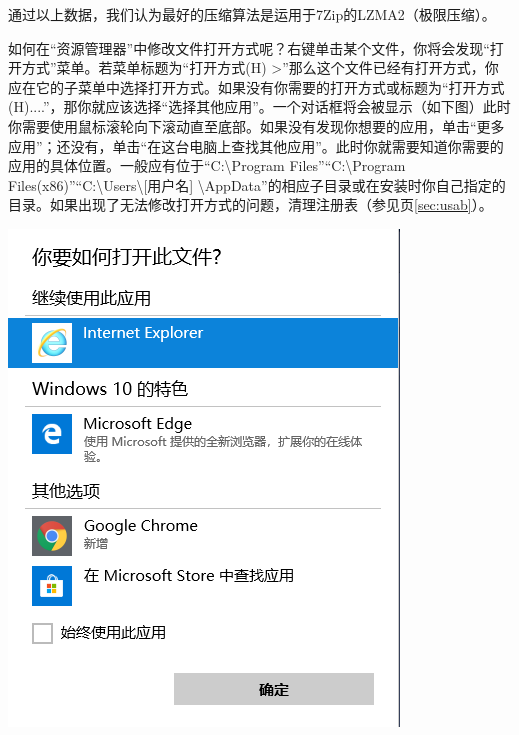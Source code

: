 通过以上数据，我们认为最好的压缩算法是运用于7Zip的LZMA2（极限压缩）。\par
如何在“资源管理器”中修改文件打开方式呢？右键单击某个文件，你将会发现“打开方式”菜单。若菜单标题为“打开方式(H)    >”那么这个文件已经有打开方式，你应在它的子菜单中选择打开方式。如果没有你需要的打开方式或标题为“打开方式(H)....”，那你就应该选择“选择其他应用”。一个对话框将会被显示（如下图）此时你需要使用鼠标滚轮向下滚动直至底部。如果没有发现你想要的应用，单击“更多应用”；还没有，单击“在这台电脑上查找其他应用”。此时你就需要知道你需要的应用的具体位置。一般应有位于“C:\textbackslash Program Files”“C:\textbackslash Program Files(x86)”“C:\textbackslash Users\textbackslash [用户名] \textbackslash AppData”的相应子目录或在安装时你自己指定的目录。{\color{red}{为了避免这个问题，你需要在安装程序时记下安装位置。}}如果出现了无法修改打开方式的问题，清理注册表（参见\pageref{sec:usab}页\ref{sec:usab}）。
\begin{center}
	\includegraphics[scale=0.5]{pic/htopen}
\end{center} \par
